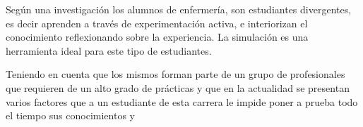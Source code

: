 Según una investigación los alumnos de enfermería, son estudiantes divergentes,
es decir aprenden a través de experimentación activa, e interiorizan el
conocimiento reflexionando sobre la experiencia. La simulación es una
herramienta ideal para este tipo de estudiantes\cite{humphreys2013developing}.

Teniendo en cuenta que los mismos forman parte de un grupo de profesionales que
requieren de un alto grado de prácticas y que en la actualidad se presentan
varios factores que a un estudiante de esta carrera le impide poner a prueba
todo el tiempo sus conocimientos y 



